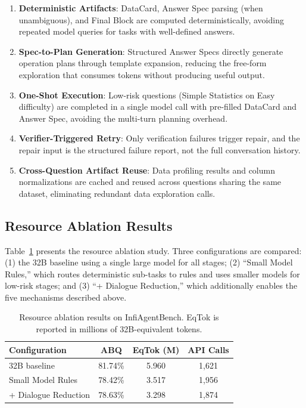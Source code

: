 \documentclass[letterpaper]{article} %
\begin{document}
\begin{enumerate}
    \item \textbf{Deterministic Artifacts}: DataCard, Answer Spec parsing (when unambiguous), and Final Block are computed deterministically, avoiding repeated model queries for tasks with well-defined answers.
    \item \textbf{Spec-to-Plan Generation}: Structured Answer Specs directly generate operation plans through template expansion, reducing the free-form exploration that consumes tokens without producing useful output.
    \item \textbf{One-Shot Execution}: Low-risk questions (Simple Statistics on Easy difficulty) are completed in a single model call with pre-filled DataCard and Answer Spec, avoiding the multi-turn planning overhead.
    \item \textbf{Verifier-Triggered Retry}: Only verification failures trigger repair, and the repair input is the structured failure report, not the full conversation history.
    \item \textbf{Cross-Question Artifact Reuse}: Data profiling results and column normalizations are cached and reused across questions sharing the same dataset, eliminating redundant data exploration calls.
\end{enumerate}

\subsection{Resource Ablation Results}

Table~\ref{tab:resource_results} presents the resource ablation study. Three configurations are compared: (1) the 32B baseline using a single large model for all stages; (2) ``Small Model Rules,'' which routes deterministic sub-tasks to rules and uses smaller models for low-risk stages; and (3) ``+ Dialogue Reduction,'' which additionally enables the five mechanisms described above.

\begin{table}[t]
\centering
\caption{Resource ablation results on InfiAgentBench. EqTok is reported in millions of 32B-equivalent tokens.}
\label{tab:resource_results}
\begin{tabular}{lccc}
\toprule
\textbf{Configuration} & \textbf{ABQ} & \textbf{EqTok (M)} & \textbf{API Calls} \\
\midrule
32B baseline & 81.74\% & 5.960 & 1,621 \\
Small Model Rules & 78.42\% & 3.517 & 1,956 \\
+ Dialogue Reduction & 78.63\% & 3.298 & 1,874 \\
\bottomrule
\end{tabular}
\end{table}
\end{document}
